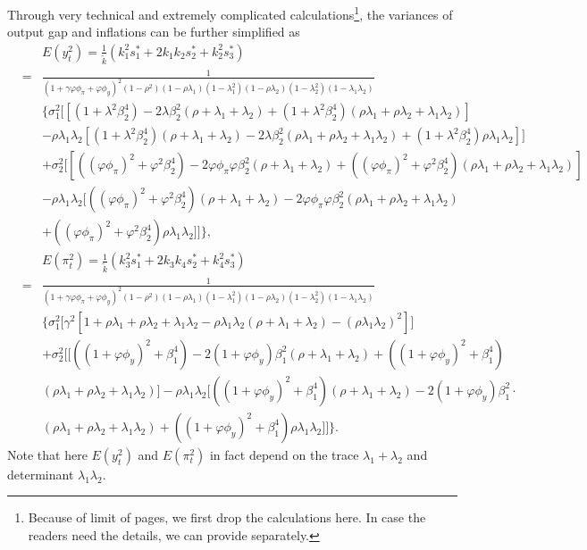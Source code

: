 \begin{appendix}
Through very technical and extremely complicated calculations\footnote{Because of limit of pages, we first drop the calculations here. In case the readers need the details, we can provide separately.}, the variances of output gap and inflations can be further simplified as
  \begin{eqnarray}
&&E(y_t^2)=\frac{1}{\widetilde{k}}( k_1^2s_1^*+2k_1k_2s_2^*+k_2^2s_3^*)\nonumber\\
&=&\frac{1}{(1+\gamma\varphi\phi_\pi+\varphi\phi_y)^2(1-\rho^2)(1-\rho\lambda_1)(1-\lambda_1^2)(1-\rho\lambda_2)(1-\lambda_2^2)(1-\lambda_1\lambda_2)}\nonumber\\
&&\Big\{\sigma_1^2\Big[[(1+\lambda^2\beta_2^4)-2\lambda\beta_2^2(\rho+\lambda_1+\lambda_2)+(1+\lambda^2\beta_2^4)(\rho\lambda_1+\rho\lambda_2+\lambda_1\lambda_2)]\nonumber\\
&&-\rho\lambda_1\lambda_2[(1+\lambda^2\beta_2^4)(\rho+\lambda_1+\lambda_2)-2\lambda\beta_2^2(\rho\lambda_1+\rho\lambda_2+\lambda_1\lambda_2)+(1+\lambda^2\beta_2^4)\rho\lambda_1\lambda_2]\Big]\nonumber\\
&&+\sigma_2^2\Big[[((\varphi\phi_\pi)^2+\varphi^2\beta_2^4)-2\varphi\phi_\pi\varphi\beta_2^2(\rho+\lambda_1+\lambda_2)+((\varphi\phi_\pi)^2+\varphi^2\beta_2^4)(\rho\lambda_1+\rho\lambda_2+\lambda_1\lambda_2)]\nonumber\\
&&-\rho\lambda_1\lambda_2[((\varphi\phi_\pi)^2+\varphi^2\beta_2^4)(\rho+\lambda_1+\lambda_2)-2\varphi\phi_\pi\varphi\beta_2^2(\rho\lambda_1+\rho\lambda_2+\lambda_1\lambda_2)\nonumber\\
&&+((\varphi\phi_\pi)^2+\varphi^2\beta_2^4)\rho\lambda_1\lambda_2]\Big]\Big\},\label{varyapp}\\
&&E(\pi_t^2)=\frac{1}{\widetilde{k}}( k_3^2s_1^*+2k_3k_4s_2^*+k_4^2s_3^*)\nonumber\\
&=&\frac{1}{(1+\gamma\varphi\phi_\pi+\varphi\phi_y)^2(1-\rho^2)(1-\rho\lambda_1)(1-\lambda_1^2)(1-\rho\lambda_2)(1-\lambda_2^2)(1-\lambda_1\lambda_2)}\nonumber\\
&&\Big\{\sigma_1^2\Big[\gamma^2[1+\rho\lambda_1+\rho\lambda_2+\lambda_1\lambda_2-\rho\lambda_1\lambda_2(\rho+\lambda_1+\lambda_2)-(\rho\lambda_1\lambda_2)^2]\Big]\nonumber\\
&&+\sigma_2^2\Big[[((1+\varphi\phi_y)^2+\beta_1^4)-2(1+\varphi\phi_y)\beta_1^2(\rho+\lambda_1+\lambda_2)+((1+\varphi\phi_y)^2+\beta_1^4)\nonumber\\
&&(\rho\lambda_1+\rho\lambda_2+\lambda_1\lambda_2)]-\rho\lambda_1\lambda_2[((1+\varphi\phi_y)^2+\beta_1^4)(\rho+\lambda_1+\lambda_2)-2(1+\varphi\phi_y)\beta_1^2\cdot\nonumber\\
&&(\rho\lambda_1+\rho\lambda_2+\lambda_1\lambda_2)+((1+\varphi\phi_y)^2+\beta_1^4)\rho\lambda_1\lambda_2]\Big]\Big\}.\label{varpiapp}
\end{eqnarray}
Note that here $E(y_t^2)$ and $E(\pi_t^2)$ in fact depend on the trace $\lambda_1+\lambda_2$ and determinant $\lambda_1\lambda_2$.



\end{appendix}
